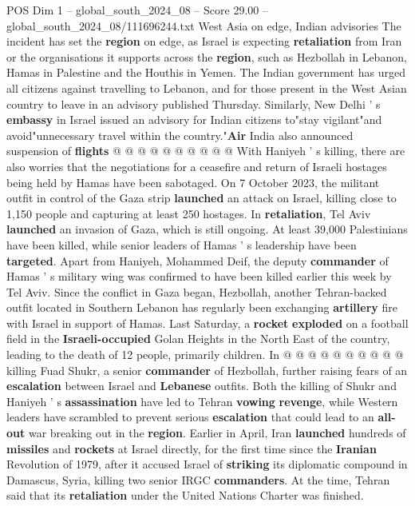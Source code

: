 \begin{textsample}{POS Dim 1 – global\_south\_2024\_08 – Score 29.00 – global\_south\_2024\_08/111696244.txt}
West Asia on edge, Indian advisories The incident has set the \textbf{region} on edge, as Israel is expecting \textbf{retaliation} from Iran or the organisations it supports across the \textbf{region}, such as Hezbollah in Lebanon, Hamas in Palestine and the Houthis in Yemen.
The Indian government has urged all citizens against travelling to Lebanon, and for those present in the West Asian country to leave in an advisory published Thursday.
Similarly, New Delhi ' s \textbf{embassy} in Israel issued an advisory for Indian citizens to"stay vigilant"and avoid"unnecessary travel within the country."\textbf{Air} India also announced suspension of \textbf{flights} @ @ @ @ @ @ @ @ @ @ With Haniyeh ' s killing, there are also worries that the negotiations for a ceasefire and return of Israeli hostages being held by Hamas have been sabotaged.
On 7 October 2023, the militant outfit in control of the Gaza strip \textbf{launched} an attack on Israel, killing close to 1,150 people and capturing at least 250 hostages.
In \textbf{retaliation}, Tel Aviv \textbf{launched} an invasion of Gaza, which is still ongoing.
At least 39,000 Palestinians have been killed, while senior leaders of Hamas ' s leadership have been \textbf{targeted}.
Apart from Haniyeh, Mohammed Deif, the deputy \textbf{commander} of Hamas ' s military wing was confirmed to have been killed earlier this week by Tel Aviv.
Since the conflict in Gaza began, Hezbollah, another Tehran-backed outfit located in Southern Lebanon has regularly been exchanging \textbf{artillery} fire with Israel in support of Hamas.
Last Saturday, a \textbf{rocket} \textbf{exploded} on a football field in the \textbf{Israeli-occupied} Golan Heights in the North East of the country, leading to the death of 12 people, primarily children.
In @ @ @ @ @ @ @ @ @ @ killing Fuad Shukr, a senior \textbf{commander} of Hezbollah, further raising fears of an \textbf{escalation} between Israel and \textbf{Lebanese} outfits.
Both the killing of Shukr and Haniyeh ' s \textbf{assassination} have led to Tehran \textbf{vowing} \textbf{revenge}, while Western leaders have scrambled to prevent serious \textbf{escalation} that could lead to an \textbf{all-out} war breaking out in the \textbf{region}.
Earlier in April, Iran \textbf{launched} hundreds of \textbf{missiles} and \textbf{rockets} at Israel directly, for the first time since the \textbf{Iranian} Revolution of 1979, after it accused Israel of \textbf{striking} its diplomatic compound in Damascus, Syria, killing two senior IRGC \textbf{commanders}.
At the time, Tehran said that its \textbf{retaliation} under the United Nations Charter was finished.

\end{textsample}
